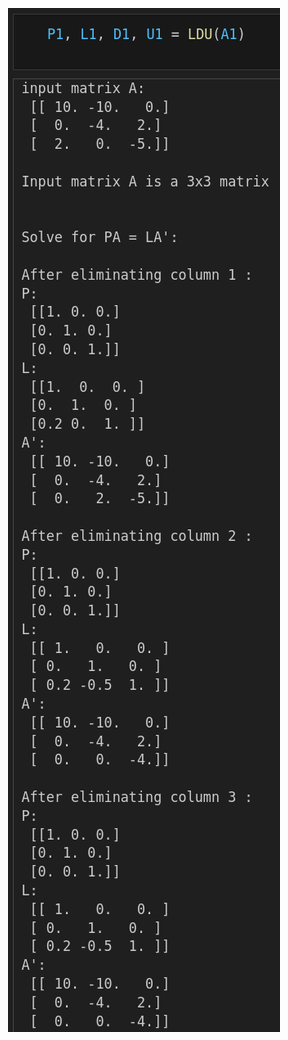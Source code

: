 \documentclass[conference,onecolumn]{IEEEtran}
\begin{document}
\begin{enumerate}[label=\arabic{enumi}.]
          \begin{figure}[t]
              \centering
              \begin{minipage}[t]{0.3\textwidth}
                  \centering
                  \includegraphics[width=\textwidth]{figs/LDU1.png}

\end{minipage}
\end{figure}
\end{enumerate}
\end{document}
